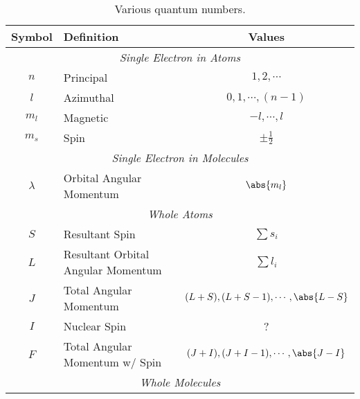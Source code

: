 \documentclass[11pt, twoside, fleqn]{report}
\begin{document}
    \begin{table}[H]
        \centering
        \caption{Various quantum numbers.}
        \label{t:quantum_numbers}
        \begin{tabular}{clc}
            \toprule
            Symbol    & Definition                            & Values                                      \\
            \midrule
            \multicolumn{3}{c}{\textit{Single Electron in Atoms}}                                           \\
            \cmidrule(lr){1-3}
            $n$       & Principal                             & $1, 2, \dotsb$                              \\
            $l$       & Azimuthal                             & $0, 1, \dotsb, (n - 1)$                     \\
            $m_{l}$   & Magnetic                              & $-l, \dotsb, l$                             \\
            $m_{s}$   & Spin                                  & $\pm \frac{1}{2}$                           \\
            \multicolumn{3}{c}{\textit{Single Electron in Molecules}}                                       \\
            \cmidrule(lr){1-3}
            $\lambda$ & Orbital Angular Momentum              & $\abs{m_{l}}$                               \\
            \multicolumn{3}{c}{\textit{Whole Atoms}}                                                        \\
            \cmidrule(lr){1-3}
            $S$       & Resultant Spin                        & $\sum s_{i}$                                \\
            $L$       & Resultant Orbital Angular Momentum    & $\sum l_{i}$                                \\
            $J$       & Total Angular Momentum                & $(L + S), (L + S - 1), \dotsb, \abs{L - S}$ \\
            $I$       & Nuclear Spin                          & ?                                           \\
            $F$       & Total Angular Momentum w/ Spin        & $(J + I), (J + I - 1), \dotsb, \abs{J - I}$ \\
            \multicolumn{3}{c}{\textit{Whole Molecules}}                                                    \\

\end{tabular}
\end{table}
\end{document}
